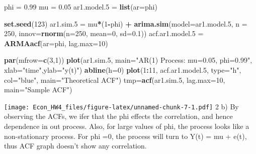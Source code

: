 \documentclass[]{article}
\newenvironment{Shaded}{\begin{snugshade}}{\end{snugshade}}
\newcommand{\KeywordTok}[1]{\textcolor[rgb]{0.13,0.29,0.53}{\textbf{#1}}}
\newcommand{\DataTypeTok}[1]{\textcolor[rgb]{0.13,0.29,0.53}{#1}}
\newcommand{\DecValTok}[1]{\textcolor[rgb]{0.00,0.00,0.81}{#1}}
\newcommand{\FloatTok}[1]{\textcolor[rgb]{0.00,0.00,0.81}{#1}}
\newcommand{\StringTok}[1]{\textcolor[rgb]{0.31,0.60,0.02}{#1}}
\newcommand{\OperatorTok}[1]{\textcolor[rgb]{0.81,0.36,0.00}{\textbf{#1}}}
\newcommand{\NormalTok}[1]{#1}
\begin{document}
\begin{Shaded}
\begin{Highlighting}[]
\NormalTok{phi =}\StringTok{ }\FloatTok{0.99}
\NormalTok{mu  =}\StringTok{ }\FloatTok{0.05}
\NormalTok{ar1.model.}\DecValTok{5}\NormalTok{ =}\StringTok{ }\KeywordTok{list}\NormalTok{(}\DataTypeTok{ar=}\NormalTok{phi)}

\KeywordTok{set.seed}\NormalTok{(}\DecValTok{123}\NormalTok{)}
\NormalTok{ar1.sim.}\DecValTok{5}\NormalTok{ =}\StringTok{ }\NormalTok{mu}\OperatorTok{*}\NormalTok{(}\DecValTok{1}\OperatorTok{-}\NormalTok{phi) }\OperatorTok{+}\StringTok{ }\KeywordTok{arima.sim}\NormalTok{(}\DataTypeTok{model=}\NormalTok{ar1.model.}\DecValTok{5}\NormalTok{, }\DataTypeTok{n =} \DecValTok{250}\NormalTok{,}
                             \DataTypeTok{innov=}\KeywordTok{rnorm}\NormalTok{(}\DataTypeTok{n=}\DecValTok{250}\NormalTok{, }\DataTypeTok{mean=}\DecValTok{0}\NormalTok{, }\DataTypeTok{sd=}\FloatTok{0.1}\NormalTok{))}
\NormalTok{acf.ar1.model.}\DecValTok{5}\NormalTok{ =}\StringTok{ }\KeywordTok{ARMAacf}\NormalTok{(}\DataTypeTok{ar=}\NormalTok{phi, }\DataTypeTok{lag.max=}\DecValTok{10}\NormalTok{)}

\KeywordTok{par}\NormalTok{(}\DataTypeTok{mfrow=}\KeywordTok{c}\NormalTok{(}\DecValTok{3}\NormalTok{,}\DecValTok{1}\NormalTok{))}
    \KeywordTok{plot}\NormalTok{(ar1.sim.}\DecValTok{5}\NormalTok{, }\DataTypeTok{main=}\StringTok{"AR(1) Process: mu=0.05, phi=0.99"}\NormalTok{,}
           \DataTypeTok{xlab=}\StringTok{"time"}\NormalTok{,}\DataTypeTok{ylab=}\StringTok{"y(t)"}\NormalTok{)}
    \KeywordTok{abline}\NormalTok{(}\DataTypeTok{h=}\DecValTok{0}\NormalTok{)}
    \KeywordTok{plot}\NormalTok{(}\DecValTok{1}\OperatorTok{:}\DecValTok{11}\NormalTok{, acf.ar1.model.}\DecValTok{5}\NormalTok{, }\DataTypeTok{type=}\StringTok{"h"}\NormalTok{, }\DataTypeTok{col=}\StringTok{"blue"}\NormalTok{, }\DataTypeTok{main=}\StringTok{"Theoretical ACF"}\NormalTok{)}
\NormalTok{    tmp=}\KeywordTok{acf}\NormalTok{(ar1.sim.}\DecValTok{5}\NormalTok{, }\DataTypeTok{lag.max=}\DecValTok{10}\NormalTok{, }\DataTypeTok{main=}\StringTok{"Sample ACF"}\NormalTok{)}
\end{Highlighting}
\end{Shaded}

\texttt{[image: Econ\_HW4\_files/figure-latex/unnamed-chunk-7-1.pdf]} 2 b)
By observing the ACFs, we ifer that the phi effects the correlation, and
hence dependence in out process. Also, for large values of phi, the
process looks like a non-stationary process. For phi =0, the process
will turn to Y(t) = mu + e(t), thus ACF graph doesn't show any
correlation.
\end{document}
